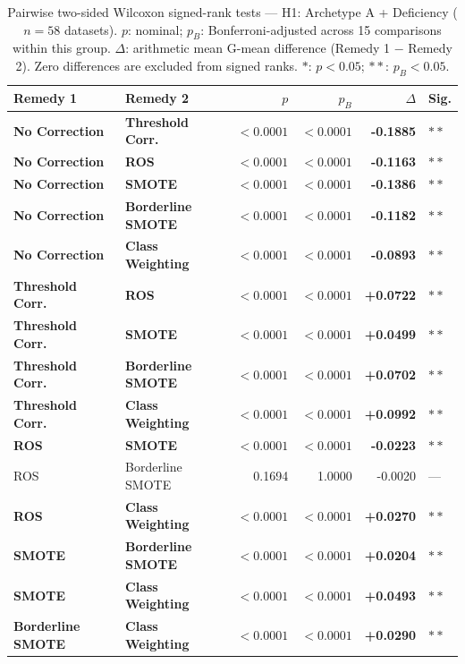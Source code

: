 \begin{table}[ht]
\centering
\scriptsize
\caption{Pairwise two-sided Wilcoxon signed-rank tests --- H1: Archetype A + Deficiency ($n=58$ datasets). $p$: nominal; $p_B$: Bonferroni-adjusted across 15 comparisons within this group. $\Delta$: arithmetic mean G-mean difference (Remedy 1 $-$ Remedy 2). Zero differences are excluded from signed ranks. $\ast$: $p<0.05$; $\ast\ast$: $p_B<0.05$.}
\label{tab:wilcoxon_h1}
\begin{tabular}{llrrrl}
\toprule
\textbf{Remedy 1} & \textbf{Remedy 2} & \textbf{$p$} & \textbf{$p_B$} & \textbf{$\Delta$} & \textbf{Sig.} \\
\midrule
    \textbf{No Correction} & \textbf{Threshold Corr.} & $<0.0001$ & $<0.0001$ & \textbf{-0.1885} & $\ast\ast$ \\
    \textbf{No Correction} & \textbf{ROS} & $<0.0001$ & $<0.0001$ & \textbf{-0.1163} & $\ast\ast$ \\
    \textbf{No Correction} & \textbf{SMOTE} & $<0.0001$ & $<0.0001$ & \textbf{-0.1386} & $\ast\ast$ \\
    \textbf{No Correction} & \textbf{Borderline SMOTE} & $<0.0001$ & $<0.0001$ & \textbf{-0.1182} & $\ast\ast$ \\
    \textbf{No Correction} & \textbf{Class Weighting} & $<0.0001$ & $<0.0001$ & \textbf{-0.0893} & $\ast\ast$ \\
    \textbf{Threshold Corr.} & \textbf{ROS} & $<0.0001$ & $<0.0001$ & \textbf{+0.0722} & $\ast\ast$ \\
    \textbf{Threshold Corr.} & \textbf{SMOTE} & $<0.0001$ & $<0.0001$ & \textbf{+0.0499} & $\ast\ast$ \\
    \textbf{Threshold Corr.} & \textbf{Borderline SMOTE} & $<0.0001$ & $<0.0001$ & \textbf{+0.0702} & $\ast\ast$ \\
    \textbf{Threshold Corr.} & \textbf{Class Weighting} & $<0.0001$ & $<0.0001$ & \textbf{+0.0992} & $\ast\ast$ \\
    \textbf{ROS} & \textbf{SMOTE} & $<0.0001$ & $<0.0001$ & \textbf{-0.0223} & $\ast\ast$ \\
    ROS & Borderline SMOTE & 0.1694 & 1.0000 & -0.0020 & --- \\
    \textbf{ROS} & \textbf{Class Weighting} & $<0.0001$ & $<0.0001$ & \textbf{+0.0270} & $\ast\ast$ \\
    \textbf{SMOTE} & \textbf{Borderline SMOTE} & $<0.0001$ & $<0.0001$ & \textbf{+0.0204} & $\ast\ast$ \\
    \textbf{SMOTE} & \textbf{Class Weighting} & $<0.0001$ & $<0.0001$ & \textbf{+0.0493} & $\ast\ast$ \\
    \textbf{Borderline SMOTE} & \textbf{Class Weighting} & $<0.0001$ & $<0.0001$ & \textbf{+0.0290} & $\ast\ast$ \\
\bottomrule
\end{tabular}
\end{table}